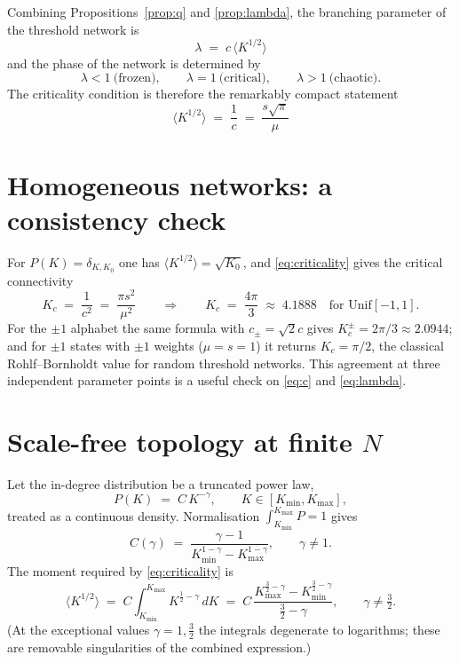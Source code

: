 \documentclass[11pt]{article}
\theoremstyle{remark}
\newcommand{\Kmin}{K_{\mathrm{min}}}
\newcommand{\Kmax}{K_{\mathrm{max}}}
\begin{document}
Combining Propositions~\ref{prop:q} and \ref{prop:lambda}, the branching
parameter of the threshold network is
\begin{equation}
  \boxed{\;\lambda \;=\; c\,\big\langle K^{1/2}\big\rangle\;}
  \label{eq:lambda}
\end{equation}
and the phase of the network is determined by
\begin{equation}
  \lambda<1 \ \text{(frozen)},\qquad
  \lambda=1 \ \text{(critical)},\qquad
  \lambda>1 \ \text{(chaotic)} .
\end{equation}
The criticality condition is therefore the remarkably compact statement
\begin{equation}
  \boxed{\;\big\langle K^{1/2}\big\rangle \;=\; \frac1c
  \;=\; \frac{s\sqrt{\pi}}{\mu}\;}
  \label{eq:criticality}
\end{equation}

\section{Homogeneous networks: a consistency check}

For $P(K)=\delta_{K,K_0}$ one has $\langle K^{1/2}\rangle=\sqrt{K_0}$, and
\eqref{eq:criticality} gives the critical connectivity
\begin{equation}
  K_c \;=\; \frac{1}{c^2} \;=\; \frac{\pi s^2}{\mu^2}
  \qquad\Longrightarrow\qquad
  K_c \;=\; \frac{4\pi}{3} \;\approx\; 4.1888
  \quad\text{for }\mathrm{Unif}[-1,1].
  \label{eq:Kc}
\end{equation}
For the $\pm1$ alphabet the same formula with $c_\pm=\sqrt2 c$ gives
$K_c^{\pm}=2\pi/3\approx2.0944$; and for $\pm1$ states with $\pm1$ weights
($\mu=s=1$) it returns $K_c=\pi/2$, the classical Rohlf--Bornholdt value for
random threshold networks. This agreement at three independent parameter points
is a useful check on \eqref{eq:c} and \eqref{eq:lambda}.

\section{Scale-free topology at finite $N$}

Let the in-degree distribution be a truncated power law,
\begin{equation}
  P(K) \;=\; C\,K^{-\gamma},
  \qquad K\in[\Kmin,\Kmax],
  \label{eq:powerlaw}
\end{equation}
treated as a continuous density. Normalisation $\int_{\Kmin}^{\Kmax}P=1$ gives
\begin{equation}
  C(\gamma)\;=\;\frac{\gamma-1}{\Kmin^{1-\gamma}-\Kmax^{1-\gamma}} ,
  \qquad \gamma\neq1 .
  \label{eq:C}
\end{equation}
The moment required by \eqref{eq:criticality} is
\begin{equation}
  \big\langle K^{1/2}\big\rangle
  \;=\; C\!\int_{\Kmin}^{\Kmax}\! K^{\frac12-\gamma}\,dK
  \;=\; C\,\frac{\Kmax^{\frac32-\gamma}-\Kmin^{\frac32-\gamma}}{\tfrac32-\gamma},
  \qquad \gamma\neq\tfrac32 .
  \label{eq:moment}
\end{equation}
(At the exceptional values $\gamma=1,\tfrac32$ the integrals degenerate to
logarithms; these are removable singularities of the combined expression.)
\end{document}
